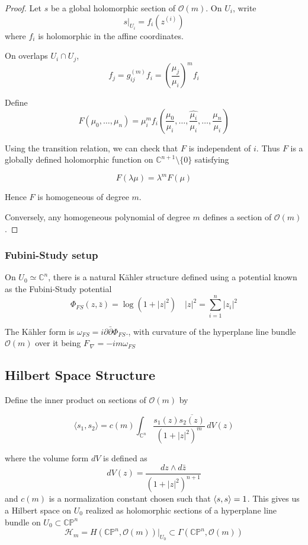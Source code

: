 \documentclass[
  12pt,
  a4paper, oneside
]{report}
\theoremstyle{bolddef}
\theoremstyle{remark}
\numberwithin{equation}{chapter}
\begin{document}
\begin{proof}
Let $s$ be a global holomorphic section of $\mathcal O(m)$.
On $U_i$, write
$$
s|_{U_i} = f_i(z^{(i)})
$$
where $f_i$ is holomorphic in the affine coordinates.

On overlaps $U_i\cap U_j$,
$$
f_j = g_{ij}^{(m)} f_i
= \left(\frac{\mu_j}{\mu_i}\right)^m f_i
$$

Define
$$
F(\mu_0,\dots,\mu_n)
=
\mu_i^m
f_i\!\left(
\frac{\mu_0}{\mu_i},
\dots,
\widehat{\frac{\mu_i}{\mu_i}},
\dots,
\frac{\mu_n}{\mu_i}
\right)
$$

Using the transition relation, we can check that $F$ is independent of $i$.
Thus $F$ is a globally defined holomorphic function on
$\mathbb C^{n+1}\setminus\{0\}$ satisfying

$$
F(\lambda \mu) = \lambda^m F(\mu)
$$

Hence $F$ is homogeneous of degree $m$.

Conversely, any homogeneous polynomial of degree $m$
defines a section of $\mathcal O(m)$.
\end{proof}

\subsubsection{Fubini-Study setup}
On $U_0 \simeq \mathbb C^n$, there is a natural Kähler structure defined using a potential known as the Fubini-Study potential
$$
\Phi_{FS}(z,\bar z)
=
\log(1+|z|^2)
\quad
|z|^2 = \sum_{i=1}^n |z_i|^2
$$

The Kähler form is $\omega_{FS}
=
i\partial\bar\partial \Phi_{FS}.$, with curvature of the hyperplane line bundle $\mathcal{O}(m)$ over it being $F_{\,\nabla} = -i m \omega_{FS}$

\subsection{Hilbert Space Structure}

Define the inner product on sections of $\mathcal O(m)$ by

$$
\langle s_1,s_2\rangle
=
c(m)
\int_{\mathbb C^n}
\frac{s_1(z)\overline{s_2(z)}}{(1+|z|^2)^m}
\, dV(z)
$$

where the volume form $dV$ is defined as
$$
dV(z)
=
\frac{dz \wedge d\bar z}{(1+|z|^2)^{n+1}}
$$
and $c(m)$ is a normalization constant chosen such that $\braket{s,s} = 1$.
This gives us a Hilbert space on $U_{0}$ realized as holomorphic sections of a hyperplane line bundle on $U_{0} \subset \mathbb{CP}^{n}$
$$
\mathcal H_m
=
H(\mathbb{CP}^{n},\mathcal{O}(m))|_{U_{0}} \subset \Gamma(\mathbb{CP}^n,\mathcal O(m))
$$
\end{document}
